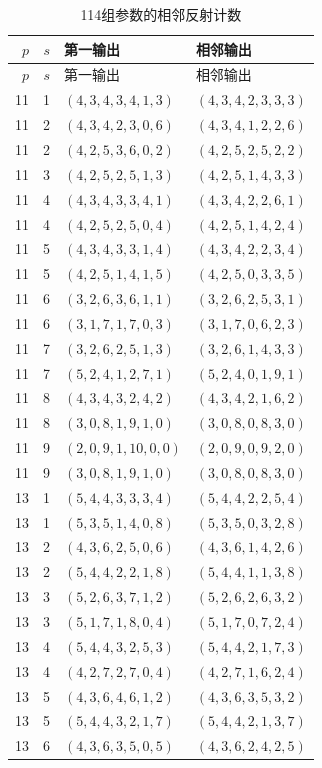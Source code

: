 \begingroup\small
\begin{longtable}{rrll}
\caption{114组参数的相邻反射计数}\label{tab:root-data}\\
\toprule $p$&$s$&第一输出&相邻输出\\\midrule\endfirsthead
\toprule $p$&$s$&第一输出&相邻输出\\\midrule\endhead
11&1&$(4,3,4,3,4,1,3)$&$(4,3,4,2,3,3,3)$\\
11&2&$(4,3,4,2,3,0,6)$&$(4,3,4,1,2,2,6)$\\
11&2&$(4,2,5,3,6,0,2)$&$(4,2,5,2,5,2,2)$\\
11&3&$(4,2,5,2,5,1,3)$&$(4,2,5,1,4,3,3)$\\
11&4&$(4,3,4,3,3,4,1)$&$(4,3,4,2,2,6,1)$\\
11&4&$(4,2,5,2,5,0,4)$&$(4,2,5,1,4,2,4)$\\
11&5&$(4,3,4,3,3,1,4)$&$(4,3,4,2,2,3,4)$\\
11&5&$(4,2,5,1,4,1,5)$&$(4,2,5,0,3,3,5)$\\
11&6&$(3,2,6,3,6,1,1)$&$(3,2,6,2,5,3,1)$\\
11&6&$(3,1,7,1,7,0,3)$&$(3,1,7,0,6,2,3)$\\
11&7&$(3,2,6,2,5,1,3)$&$(3,2,6,1,4,3,3)$\\
11&7&$(5,2,4,1,2,7,1)$&$(5,2,4,0,1,9,1)$\\
11&8&$(4,3,4,3,2,4,2)$&$(4,3,4,2,1,6,2)$\\
11&8&$(3,0,8,1,9,1,0)$&$(3,0,8,0,8,3,0)$\\
11&9&$(2,0,9,1,10,0,0)$&$(2,0,9,0,9,2,0)$\\
11&9&$(3,0,8,1,9,1,0)$&$(3,0,8,0,8,3,0)$\\
13&1&$(5,4,4,3,3,3,4)$&$(5,4,4,2,2,5,4)$\\
13&1&$(5,3,5,1,4,0,8)$&$(5,3,5,0,3,2,8)$\\
13&2&$(4,3,6,2,5,0,6)$&$(4,3,6,1,4,2,6)$\\
13&2&$(5,4,4,2,2,1,8)$&$(5,4,4,1,1,3,8)$\\
13&3&$(5,2,6,3,7,1,2)$&$(5,2,6,2,6,3,2)$\\
13&3&$(5,1,7,1,8,0,4)$&$(5,1,7,0,7,2,4)$\\
13&4&$(5,4,4,3,2,5,3)$&$(5,4,4,2,1,7,3)$\\
13&4&$(4,2,7,2,7,0,4)$&$(4,2,7,1,6,2,4)$\\
13&5&$(4,3,6,4,6,1,2)$&$(4,3,6,3,5,3,2)$\\
13&5&$(5,4,4,3,2,1,7)$&$(5,4,4,2,1,3,7)$\\
13&6&$(4,3,6,3,5,0,5)$&$(4,3,6,2,4,2,5)$\\

\end{longtable}
